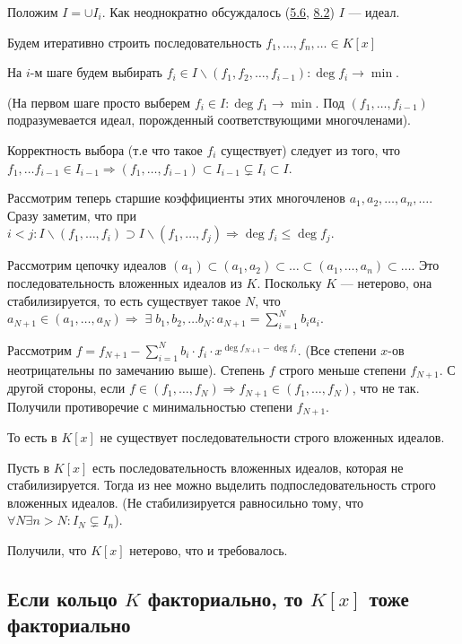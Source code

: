 \documentclass[../main.tex]{subfiles}
\begin{document}
    Положим $I = \cup I_i$. Как неоднократно обсуждалось (\hyperlink{5.6}{5.6},
    \hyperlink{8.2}{8.2}) $I$ --- идеал.

    Будем итеративно строить последовательность
    $f_1, \ldots, f_n, \ldots \in K[x]$

    На $i$-м шаге будем выбирать
    $f_i \in I \backslash (f_1, f_2, \ldots, f_{i - 1}): \deg f_i \to \min$.

    (На первом шаге просто выберем $f_i \in I: \deg f_1 \to \min$.
    Под $(f_1, \ldots, f_{i - 1})$ подразумевается идеал, порожденный
    соответствующими многочленами).

    Корректность выбора (т.е что такое $f_i$ существует) следует из того, что
    $f_1, \ldots f_{i - 1} \in
    I_{i - 1} \Rightarrow (f_1, \ldots, f_{i - 1}) \subset I_{i - 1}
    \subsetneq I_i \subset I$.

    Рассмотрим теперь старшие коэффициенты этих многочленов
    $a_1, a_2, \ldots, a_n, \ldots$. Сразу заметим, что при $i < j:
    I \backslash (f_1, \ldots, f_i) \supset I \backslash (f_1, \ldots, f_j)
    \Rightarrow \deg f_i \leqslant \deg f_j$.

    Рассмотрим цепочку идеалов $(a_1) \subset (a_1, a_2) \subset \ldots
    \subset (a_1, \ldots, a_n) \subset \ldots $. Это последовательность
    вложенных идеалов из $K$. Поскольку $K$ --- нетерово, она стабилизируется,
    то есть существует такое $N$, что $a_{N + 1} \in (a_1, \ldots, a_N)
    \Rightarrow \; \exists \; b_1, b_2, \ldots b_N: a_{N + 1}
    = \sum\limits_{i = 1}^N b_i a_i$.

    Рассмотрим $f = f_{N + 1} - \sum\limits_{i = 1}^N b_i \cdot f_i \cdot
    x^{\deg f_{N + 1} - \deg f_i}$. (Все степени $x$-ов неотрицательны
    по замечанию выше). Степень $f$ строго меньше степени $f_{N + 1}$. С другой
    стороны, если $f \in (f_1, \ldots, f_N) \Rightarrow f_{N + 1} \in
    (f_1, \ldots, f_N)$, что не так. Получили противоречие с минимальностью
    степени $f_{N + 1}$.

    То есть в $K[x]$ не существует последовательности строго вложенных идеалов.

    Пусть в $K[x]$ есть последовательность вложенных идеалов, которая
    не стабилизируется. Тогда из нее можно выделить подпоследовательность
    строго вложенных идеалов. (Не стабилизируется равносильно тому, что
    $\forall N \exists n > N: I_N \subsetneq I_n$).

    Получили, что $K[x]$ нетерово, что и требовалось.


\hypertarget{9.3}{\subsection{Если кольцо $K$ факториально, то $K[x]$ тоже факториально}}
\end{document}
